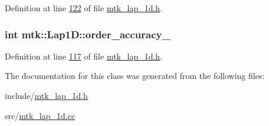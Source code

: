 Definition at line \hyperlink{mtk__lap__1d_8h_source_l00122}{122} of file \hyperlink{mtk__lap__1d_8h_source}{mtk\+\_\+lap\+\_\+1d.\+h}.

\hypertarget{classmtk_1_1Lap1D_a35d34c085b9cf6f9961a699dfb02fea6}{
\subsubsection[{order\+\_\+accuracy\+\_\+}]{\setlength{\rightskip}{0pt plus 5cm}int mtk\+::\+Lap1\+D\+::order\+\_\+accuracy\+\_\+\hspace{0.3cm}{\ttfamily [private]}}}\label{classmtk_1_1Lap1D_a35d34c085b9cf6f9961a699dfb02fea6}


Definition at line \hyperlink{mtk__lap__1d_8h_source_l00117}{117} of file \hyperlink{mtk__lap__1d_8h_source}{mtk\+\_\+lap\+\_\+1d.\+h}.



The documentation for this class was generated from the following files\+:\begin{DoxyCompactItemize}
\item 
include/\hyperlink{mtk__lap__1d_8h}{mtk\+\_\+lap\+\_\+1d.\+h}\item 
src/\hyperlink{mtk__lap__1d_8cc}{mtk\+\_\+lap\+\_\+1d.\+cc}\end{DoxyCompactItemize}
